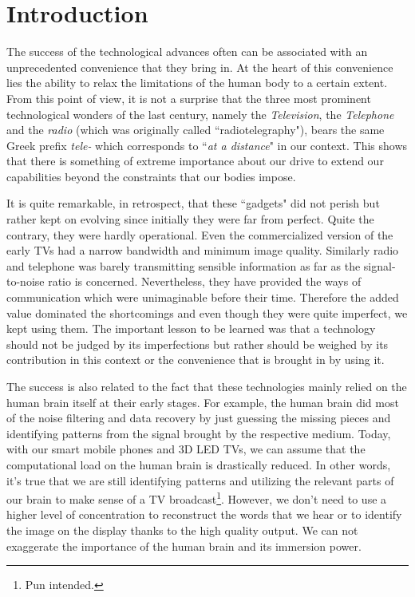 
\chapter{Introduction}
\label{chap:intro}

The success of the technological advances often can be associated with an unprecedented convenience that they bring in. At the heart of this convenience lies the ability to relax the limitations of the human body to a certain extent. From this point of view, it is not a surprise that the three most prominent technological wonders of the last century, namely the \emph{Television}, the \emph{Telephone} and the \emph{radio} (which was originally called ``radiotelegraphy"), bears the same Greek prefix \emph{tele-} which corresponds to ``\emph{at a distance}" in our context. This shows that there is something of extreme importance about our drive to extend our capabilities beyond the constraints that our bodies impose.


It is quite remarkable, in retrospect, that these ``gadgets" did not perish but rather kept on evolving since initially they were far from perfect. Quite the contrary, they were hardly operational. Even the commercialized version of the early TVs had a narrow bandwidth and minimum image quality. Similarly radio and telephone was barely transmitting sensible information as far as the signal-to-noise ratio is concerned. Nevertheless, they have provided the ways of communication which were unimaginable before their time. Therefore the added value dominated the shortcomings and even though they were quite imperfect, we kept using them. The important lesson to be learned was that a technology should not be judged by its imperfections but rather should be weighed by its contribution in this context or the convenience that is brought in by using it.  

The success is also related to the fact that these technologies mainly relied on the human brain itself at their early stages. For example, the human brain did most of the noise filtering and data recovery by just guessing the missing pieces and identifying patterns from the signal brought by the respective medium. Today, with our smart mobile phones and 3D LED TVs, we can assume that the computational load on the human brain is drastically reduced. In other words, it's true that we are still identifying patterns and utilizing the relevant parts of our brain to make sense of a TV broadcast\footnote{Pun intended.}. However, we don't need to use a higher level of concentration to reconstruct the words that we hear or to identify the image on the display thanks to the high quality output. We can not exaggerate the importance of the human brain and its immersion power. 

